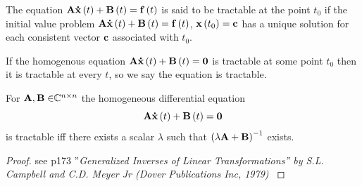 \begin{definition}
The equation ${\bf A\dot{x}}\left( t\right) +{\bf B}\left( t\right) ={\bf f}%
\left( t\right) $ is said to be tractable at the point $t_{0}$ if the
initial value problem ${\bf A\dot{x}}\left( t\right) +{\bf B}\left( t\right)
={\bf f}\left( t\right) $, ${\bf x}\left( t_{0}\right) ={\bf c}$ has a
unique solution for each consistent vector ${\bf c}$ associated with $t_{0}$.
\end{definition}

If the homogenous equation ${\bf A\dot{x}}\left( t\right) +{\bf B}\left(
t\right) ={\bf 0}$ is tractable at some point $t_{0}$ then it is tractable
at every $t$, so we say the equation is tractable.

\begin{theorem}
For ${\bf A,B\in }{\Bbb C}^{n\times n}$ the homogeneous differential
equation 
\begin{equation}
{\bf A\dot{x}}\left( t\right) +{\bf B}\left( t\right) ={\bf 0}
\end{equation}%
is tractable iff there exists a scalar $\lambda $ such that $\left( \lambda 
{\bf A+B}\right) ^{-1}$ exists.
\end{theorem}

\begin{proof}
see p173 ''{\it Generalized Inverses of Linear Transformations'' by S.L.
Campbell and C.D. Meyer Jr (Dover Publications Inc, 1979) }
\end{proof}

